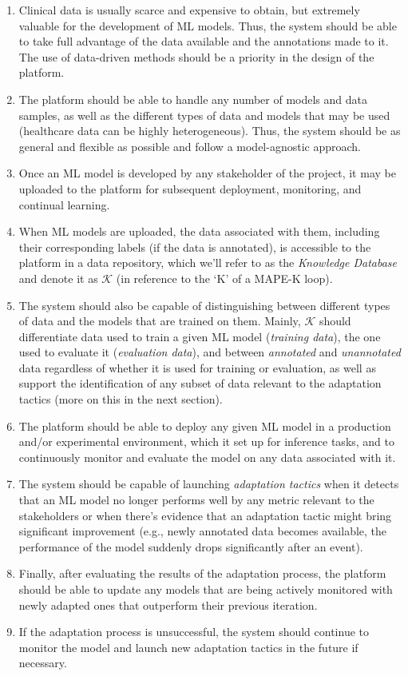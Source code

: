 \documentclass[../main.tex]{subfiles}
\begin{document}
    \begin{enumerate}
        \item Clinical data is usually scarce and expensive to obtain, but extremely valuable for the development of ML models. Thus, the system should be able to take full advantage of the data available and the annotations made to it. The use of data-driven methods should be a priority in the design of the platform.
        \item The platform should be able to handle any number of models and data samples, as well as the different types of data and models that may be used (healthcare data can be highly heterogeneous). Thus, the system should be as general and flexible as possible and follow a model-agnostic approach.
        \item Once an ML model is developed by any stakeholder of the project, it may be uploaded to the platform for subsequent deployment, monitoring, and continual learning. 
        \item  When ML models are uploaded, the data associated with them, including their corresponding labels (if the data is annotated), is accessible to the platform in a data repository, which we'll refer to as the \textit{Knowledge Database} and denote it as $\mathcal{K}$ (in reference to the `K' of a MAPE-K loop).
        \item The system should also be capable of distinguishing between different types of data and the models that are trained on them. Mainly, $\mathcal{K}$ should differentiate data used to train a given ML model (\textit{training data}), the one used to evaluate it (\textit{evaluation data}), and between \textit{annotated} and \textit{unannotated} data regardless of whether it is used for training or evaluation, as well as support the identification of any subset of data relevant to the adaptation tactics (more on this in the next section).
        \item The platform should be able to deploy any given ML model in a production and/or experimental environment, which it set up for inference tasks, and to continuously monitor and evaluate the model on any data associated with it.
        \item The system should be capable of launching \textit{adaptation tactics} when it detects that an ML model no longer performs well by any metric relevant to the stakeholders or when there's evidence that an adaptation tactic might bring significant improvement (e.g., newly annotated data becomes available, the performance of the model suddenly drops significantly after an event).
        \item Finally, after evaluating the results of the adaptation process,  the platform should be able to update any models that are being actively monitored with newly adapted ones that outperform their previous iteration. 
        \item If the adaptation process is unsuccessful, the system should continue to monitor the model and launch new adaptation tactics in the future if necessary.
    \end{enumerate}
\end{document}
